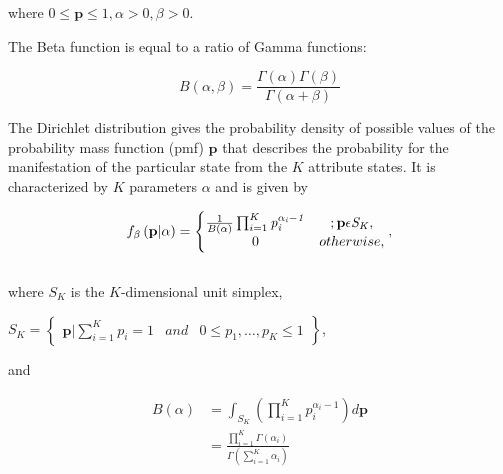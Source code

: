 \documentclass[a4,12pt]{ozu-thesis}
\begin{document}
\begin{center}
where $0\leq \mathbf{p}\leq 1, \alpha> 0, \beta> 0 $.
\end{center}

The Beta function is equal to a ratio of Gamma functions:

\begin{equation}
B\left ( \alpha, \beta \right ) = \frac{\Gamma \left ( \alpha \right )\Gamma \left ( \beta \right )}{\Gamma \left ( \alpha+\beta \right )}
\end{equation}


The Dirichlet distribution gives the probability density of possible values of the probability mass function (pmf) $\mathbf{p}$  that describes the probability for the manifestation of the particular state from the $\mathit{K}$ attribute states. It is characterized by $\mathit{K}$ parameters $\mathit{\alpha}$ and is given by 


\begin{equation}
f_{\beta }\left ( \mathbf{p|\alpha} \right ) = \left\{\begin{matrix} \frac{1}{B\left ( \alpha \right )}\prod_{i=1}^{\mathit{K}} \mathit{p_{i}^{\alpha_{i}-1}}&;    \mathbf{  p} \epsilon \mathit{ S_{K}}$$,\\ 
$$0 &        otherwise, \end{matrix}\right.,
\end{equation}
\\where $\mathit{ S_{K}}$ is the $\mathit{K}$-dimensional unit simplex,

\begin{center}
$\mathit{ S_{K}} = \begin{Bmatrix} \mathbf{p}|\sum_{i=1}^{K} \mathit{p_{i}=1} & and  & 0\leq \mathit{p_{1},\ldots,p_{K}\leq 1} \end{Bmatrix}$,

\end{center}   

and


\begin{subequations}
\label{eq:optim}
\begin{align}
    B\left ( \alpha \right ) & = \int_{\mathit{ S_{K}}}\left ( \prod_{i=1}^{K}  \mathit{p_{i}^{\alpha_{i}-1}}\right ) d\mathbf{p}   \label{eq:cost}\\
   & =\frac{\prod_{i=1}^{K} \Gamma \left ( \alpha_{i} \right )}{\Gamma \left ( \sum_{i=1}^{K} \alpha_{i} \right )} \label{eq:const1}
\end{align}
\end{subequations}
\end{document}
